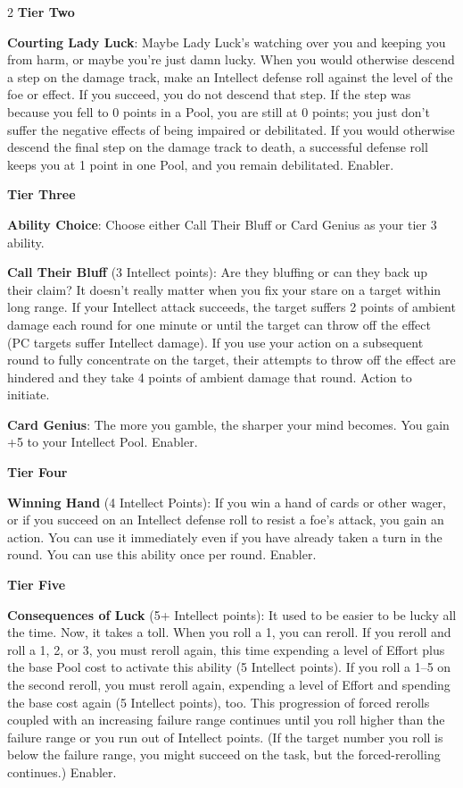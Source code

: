 \begin{multicols}{2}
\textbf{Tier Two}

\textbf{Courting Lady Luck}: Maybe Lady Luck’s watching over you and keeping you from harm, or maybe you’re just damn lucky. When you would otherwise descend a step on the damage track, make an Intellect defense roll against the level of the foe or effect. If you succeed, you do not descend that step. If the step was because you fell to 0 points in a Pool, you are still at 0 points; you just don’t suffer the negative effects of being impaired or debilitated. If you would otherwise descend the final step on the damage track to death, a successful defense roll keeps you at 1 point in one Pool, and you remain debilitated. Enabler. 

\textbf{Tier Three}

\textbf{Ability Choice}: Choose either Call Their Bluff or Card Genius as your tier 3 ability. 

\textbf{Call Their Bluff} (3 Intellect points): Are they bluffing or can they back up their claim? It doesn’t really matter when you fix your stare on a target within long range. If your Intellect attack succeeds, the target suffers 2 points of ambient damage each round for one minute or until the target can throw off the effect (PC targets suffer Intellect damage). If you use your action on a subsequent round to fully concentrate on the target, their attempts to throw off the effect are hindered and they take 4 points of ambient damage that round. Action to initiate. 

\textbf{Card Genius}: The more you gamble, the sharper your mind becomes. You gain +5 to your Intellect Pool. Enabler. 

\textbf{Tier Four}

\textbf{Winning Hand} (4 Intellect Points): If you win a hand of cards or other wager, or if you succeed on an Intellect defense roll to resist a foe’s attack, you gain an action. You can use it immediately even if you have already taken a turn in the round. You can use this ability once per round. Enabler. 

\textbf{Tier Five}
 
\textbf{Consequences of Luck} (5+ Intellect points): It used to be easier to be lucky all the time. Now, it takes a toll. When you roll a 1, you can reroll. If you reroll and roll a 1, 2, or 3, you must reroll again, this time expending a level of Effort plus the base Pool cost to activate this ability (5 Intellect points). If you roll a 1–5 on the second reroll, you must reroll again, expending a level of Effort and spending the base cost again (5 Intellect points), too. This progression of forced rerolls coupled with an increasing failure range continues until you roll higher than the failure range or you run out of Intellect points. (If the target number you roll is below the failure range, you might succeed on the task, but the forced-rerolling continues.) Enabler. 


\end{multicols}
